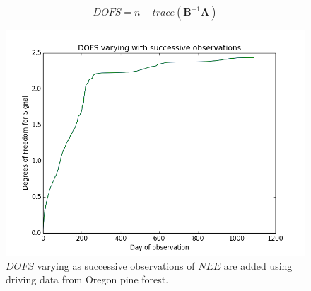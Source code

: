 \documentclass[11pt]{article}
\begin{document}
\[
DOFS=n-trace(\textbf{B}^{-1}\textbf{A})
\]

\begin{figure}[h]
\centering
\includegraphics[width=.9\textwidth]{DOFS_0_1090Cf_Cpoolsconst.png}
\caption{$DOFS$ varying as successive observations of $NEE$ are added using driving data from Oregon pine forest.}
\label{fig:SIC_subplot}
\end{figure}



{}

\end{document}

